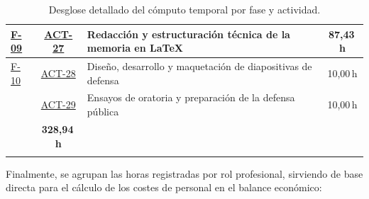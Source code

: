 \begin{appendices}
\begin{table}[H]
{\begin{tabularx}{1.1\textwidth}{l c Y c}
      \hyperref[fase:memoria]{F-09} 
        & \hyperref[act:27]{ACT-27} & Redacción y estructuración técnica de la memoria en LaTeX & 87,43\,h \\
      \hline
      \hyperref[fase:defensa]{F-10} 
        & \hyperref[act:28]{ACT-28} & Diseño, desarrollo y maquetación de diapositivas de defensa & 10,00\,h \\
        & \hyperref[act:29]{ACT-29} & Ensayos de oratoria y preparación de la defensa pública & 10,00\,h \\
      \bighline
       & \textbf{328,94\,h} \\
      \bighline
    \end{tabularx}%
  }
  \caption{Desglose detallado del cómputo temporal por fase y actividad.}
  \label{tab:desglose_actividades}
\end{table}

Finalmente, se agrupan las horas registradas por rol profesional, sirviendo de base directa para el cálculo de los costes de personal en el balance económico:


\end{appendices}
